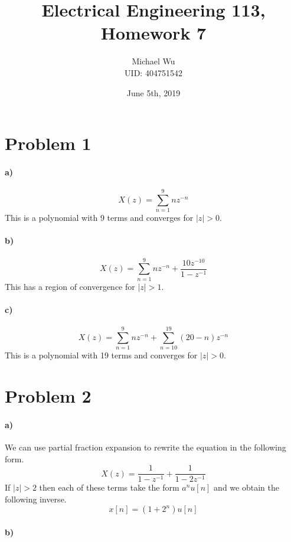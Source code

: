 \documentclass[12pt]{article}
\begin{document}
\title{Electrical Engineering 113, Homework 7}
\date{June 5th, 2019}
\author{Michael Wu\\UID: 404751542}
\maketitle

\section*{Problem 1}

\paragraph{a)}

\[X(z)=\sum_{n=1}^9 nz^{-n}\]
This is a polynomial with 9 terms and converges for \(|z|>0\).

\paragraph{b)}

\[X(z)=\sum_{n=1}^9 nz^{-n} + \frac{10z^{-10}}{1-z^{-1}}\]
This has a region of convergence for \(|z|>1\).

\paragraph{c)}

\[X(z)=\sum_{n=1}^9 nz^{-n} + \sum_{n=10}^{19} (20-n)z^{-n}\]
This is a polynomial with 19 terms and converges for \(|z|>0\).

\section*{Problem 2}

\paragraph{a)}

We can use partial fraction expansion to rewrite the equation in the following form.
\[X(z)=\frac{1}{1-z^{-1}}+\frac{1}{1-2 z^{-1}}\]
If \(|z|>2\) then each of these terms take the form \(a^nu[n]\) and we obtain the following inverse.
\[x[n]=(1+2^n)u[n]\]

\paragraph{b)}
\end{document}
